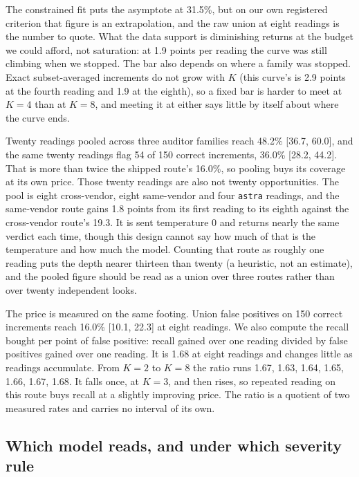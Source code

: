 The constrained fit puts the asymptote at 31.5\%, but on our own registered criterion that figure
is an extrapolation, and the raw union at eight readings is the number to quote. What the data
support is diminishing returns at the budget we could afford, not saturation: at 1.9 points per
reading the curve was still climbing when we stopped. The bar also depends on where a family was
stopped. Exact subset-averaged increments do not grow with $K$ (this curve's is 2.9 points at the
fourth reading and 1.9 at the eighth), so a fixed bar is harder to meet at $K = 4$ than at
$K = 8$, and meeting it at either says little by itself about where the curve ends.

Twenty readings pooled across three auditor families reach 48.2\% [36.7, 60.0], and the same
twenty readings flag 54 of 150 correct increments, 36.0\% [28.2, 44.2]. That is more than
twice the shipped route's 16.0\%, so pooling buys its coverage at its own price. Those twenty
readings are also not twenty opportunities. The pool is eight cross-vendor, eight same-vendor and
four \texttt{astra} readings, and the same-vendor route gains 1.8 points from its first reading to
its eighth against the cross-vendor route's 19.3. It is sent temperature $0$ and returns nearly the
same verdict each time, though this design cannot say how much of that is the temperature and how
much the model. Counting that route as roughly one reading puts the depth nearer thirteen than
twenty (a heuristic, not an estimate), and the pooled figure should be read as a union over three
routes rather than over twenty independent looks.

The price is measured on the same footing. Union false positives on 150 correct increments reach
16.0\% [10.1, 22.3] at eight readings. We also compute the recall bought per point of false
positive: recall gained over one reading divided by false positives gained over one reading. It is
1.68 at eight readings and changes little as readings accumulate. From $K=2$ to $K=8$ the
ratio runs 1.67, 1.63, 1.64, 1.65, 1.66, 1.67, 1.68. It falls once, at $K=3$, and then rises, so repeated
reading on this route buys recall at a slightly improving price. The ratio is a quotient of two
measured rates and carries no interval of its own.



\subsection{Which model reads, and under which severity rule}
\label{sec:auditor}

